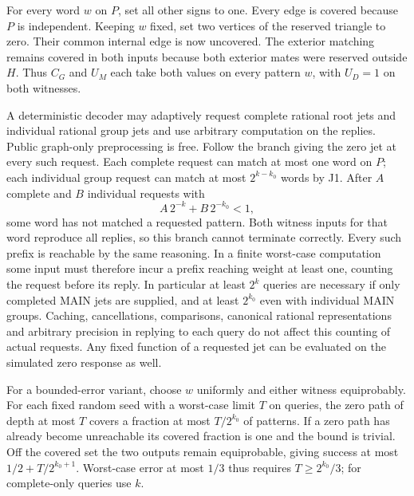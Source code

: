 \documentclass[11pt,a4paper]{article}
\begin{document}
For every word \(w\) on \(P\), set all other signs to one. Every edge is
covered because \(P\) is independent. Keeping \(w\) fixed, set two
vertices of the reserved triangle to zero. Their common internal edge is
now uncovered. The exterior matching remains covered in both inputs
because both exterior mates were reserved outside \(H\). Thus \(C_G\)
and \(U_M\) each take both values on every pattern \(w\), with \(U_D=1\)
on both witnesses.

A deterministic decoder may adaptively request complete rational root
jets and individual rational group jets and use arbitrary computation on
the replies. Public graph-only preprocessing is free. Follow the branch
giving the zero jet at every such request. Each complete request can
match at most one word on \(P\); each individual group request can match
at most \(2^{k-k_0}\) words by J1. After \(A\) complete and \(B\)
individual requests with \[
                        A\,2^{-k}+B\,2^{-k_0}<1,                 \tag{Q1}
\] some word has not matched a requested pattern. Both witness inputs
for that word reproduce all replies, so this branch cannot terminate
correctly. Every such prefix is reachable by the same reasoning. In a
finite worst-case computation some input must therefore incur a prefix
reaching weight at least one, counting the request before its reply. In
particular at least \(2^k\) queries are necessary if only completed MAIN
jets are supplied, and at least \(2^{k_0}\) even with individual MAIN
groups. Caching, cancellations, comparisons, canonical rational
representations and arbitrary precision in replying to each query do not
affect this counting of actual requests. Any fixed function of a
requested jet can be evaluated on the simulated zero response as well.

For a bounded-error variant, choose \(w\) uniformly and either witness
equiprobably. For each fixed random seed with a worst-case limit \(T\)
on queries, the zero path of depth at most \(T\) covers a fraction at
most \(T/2^{k_0}\) of patterns. If a zero path has already become
unreachable its covered fraction is one and the bound is trivial. Off
the covered set the two outputs remain equiprobable, giving success at
most \(1/2+T/2^{k_0+1}\). Worst-case error at most \(1/3\) thus requires
\(T\ge 2^{k_0}/3\); for complete-only queries use \(k\).
\end{document}
